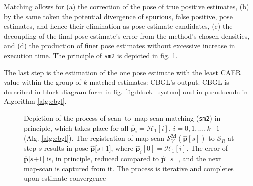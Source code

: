 Matching allows for (a) the correction of the pose of true positive estimates,
(b) by the same token the potential divergence of spurious, false positive,
pose estimates, and hence their elimination as pose estimate candidates, (c)
the decoupling of the final pose estimate's error from the method's chosen
densities, and (d) the production of finer pose estimates without excessive
increase in execution time. The principle of \texttt{sm2} is depicted in fig.
\ref{fig:sm2_evolution}.

The last step is the estimation of the one pose estimate with the least CAER
value within the group of $k$ matched estimates: CBGL's output. CBGL is
described in block diagram form in fig.  \ref{fig:block_system} and in
pseudocode in Algorithm \ref{alg:cbgl}.

\begin{figure}[]\vspace{1.5cm}
  
  \caption{\small Depiction of the process of scan--to--map-scan matching
           (\texttt{sm2}) in principle, which takes place for all
           $\hat{\bm{p}}_i = \mathcal{H}_1[i]$, $i=0,1,\dots,k$$-$$1$ (Alg.
           \ref{alg:cbgl}). The registration of map-scan
           $\mathcal{S}_V^{\bm{M}}(\hat{\bm{p}}[s])$ to $\mathcal{S}_R$ at step
           $s$ results in pose $\hat{\bm{p}}[s$$+$$1]$, where
           $\hat{\bm{p}}_i[0] = \mathcal{H}_1[i]$. The error of
           $\hat{\bm{p}}[s$$+$$1]$ is, in principle, reduced compared to
           $\hat{\bm{p}}[s]$, and the next map-scan is captured from it. The
           process is iterative and completes upon estimate convergence}
  \label{fig:sm2_evolution}
\end{figure}


